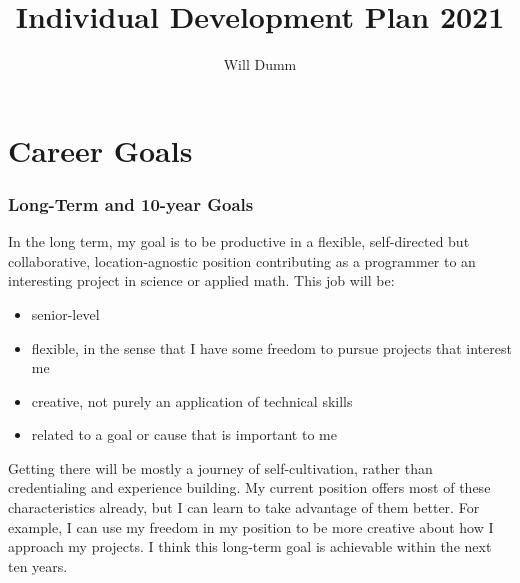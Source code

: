 \documentclass{paper}
\title{Individual Development Plan 2021}
\author{Will Dumm}
\begin{document}
\maketitle



\section*{Career Goals}

\subsubsection*{Long-Term and 10-year Goals}
In the long term, my goal is to be productive in a flexible, self-directed but collaborative, location-agnostic position contributing as a programmer to an interesting project in science or applied math.
This job will be:
\begin{itemize}
    \item senior-level
    \item flexible, in the sense that I have some freedom to pursue projects that interest me
    \item creative, not purely an application of technical skills
    \item related to a goal or cause that is important to me
\end{itemize}
Getting there will be mostly a journey of self-cultivation, rather than credentialing and experience building.
My current position offers most of these characteristics already, but I can learn to take advantage of them better. For example, I can use my freedom in my position to be more creative about how I approach my projects.
I think this long-term goal is achievable within the next ten years.
\end{document}
